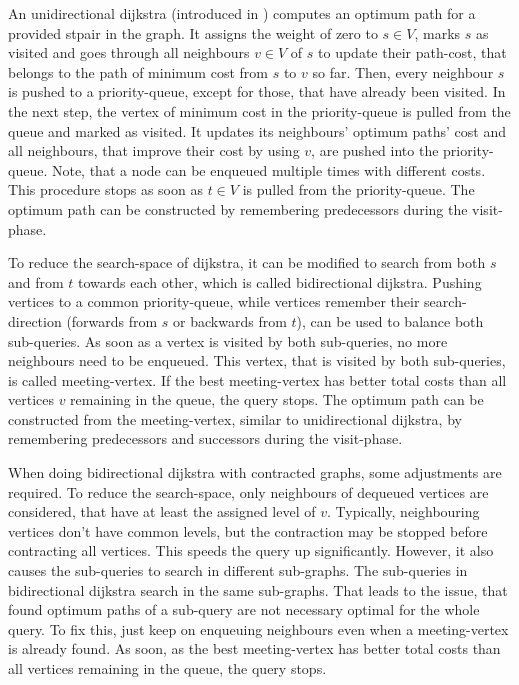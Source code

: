     An unidirectional \gls{dijkstra} (introduced in \cite{dijkstra:dijkstra}) computes an optimum path for a provided \gls{stpair} in the graph.
    It assigns the weight of zero to $s \in V$, marks $s$ as visited and goes through all neighbours $v \in V$ of $s$ to update their path-cost, that belongs to the path of minimum cost from $s$ to $v$ so far.
    Then, every neighbour $s$ is pushed to a priority-queue, except for those, that have already been visited.
    In the next step, the vertex of minimum cost in the priority-queue is pulled from the queue and marked as visited.
    It updates its neighbours' optimum paths' cost and all neighbours, that improve their cost by using $v$, are pushed into the priority-queue.
    Note, that a node can be enqueued multiple times with different costs.
    This procedure stops as soon as $t \in V$ is pulled from the priority-queue.
    The optimum path can be constructed by remembering predecessors during the visit-phase.

    To reduce the search-space of \gls{dijkstra}, it can be modified to search from both $s$ and from $t$ towards each other, which is called bidirectional \gls{dijkstra}.
    Pushing vertices to a common priority-queue, while vertices remember their search-direction (forwards from $s$ or backwards from $t$), can be used to balance both sub-queries.
    As soon as a vertex is visited by both sub-queries, no more neighbours need to be enqueued.
    This vertex, that is visited by both sub-queries, is called meeting-vertex.
    If the best meeting-vertex has better total costs than all vertices $v$ remaining in the queue, the query stops.
    The optimum path can be constructed from the meeting-vertex, similar to unidirectional \gls{dijkstra}, by remembering predecessors and successors during the visit-phase.

    When doing bidirectional \gls{dijkstra} with contracted graphs, some adjustments are required.
    To reduce the search-space, only neighbours of dequeued vertices are considered, that have at least the assigned level of $v$.
    Typically, neighbouring vertices don't have common levels, but the contraction may be stopped before contracting all vertices.
    This speeds the query up significantly.
    However, it also causes the sub-queries to search in different sub-graphs.
    The sub-queries in bidirectional \gls{dijkstra} search in the same sub-graphs.
    That leads to the issue, that found optimum paths of a sub-query are not necessary optimal for the whole query.
    To fix this, just keep on enqueuing neighbours even when a meeting-vertex is already found.
    As soon, as the best meeting-vertex has better total costs than all vertices remaining in the queue, the query stops.

